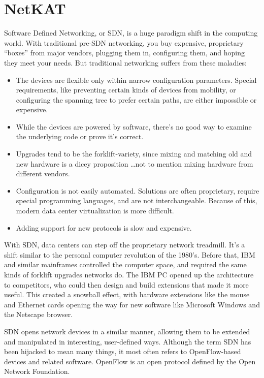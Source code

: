 
\chapter{NetKAT}

Software Defined Networking, or SDN, is a huge paradigm shift in the computing world.  
With traditional pre-SDN networking, you buy 
expensive, proprietary ``boxes'' from major vendors, plugging them in, configuring them, and hoping they 
meet your needs.  
But traditional networking suffers from these maladies:

\begin{itemize}
\item The devices are flexible only within narrow configuration parameters. 
Special requirements, like preventing certain kinds of devices from mobility, or configuring 
the spanning tree to prefer certain paths, are either impossible or expensive.
\item While the devices are powered by software, there's no good way to examine the underlying code or prove it's correct.  
\item Upgrades tend to be the forklift-variety, since mixing and matching old and new hardware is a dicey proposition
\ldots not to mention mixing hardware from different vendors.
\item Configuration is not easily automated. 
Solutions are often proprietary, require special programming languages, and are not interchangeable.
Because of this, modern data center virtualization is more difficult.
\item Adding support for new protocols is slow and expensive.
\end{itemize}

With SDN, data centers can step off the proprietary network treadmill.  
It's a shift similar to the personal computer revolution of the 1980's.
Before that, IBM and similar mainframes controlled the computer space, and required the same kinds of 
forklift upgrades networks do.
The IBM PC opened up the architecture to competitors, who could then design and 
build extensions
that made it more useful.
This created a snowball effect, with hardware extensions like the mouse and Ethernet cards opening the way 
for new software like Microsoft Windows and the Netscape browser.

SDN opens network devices in a similar manner, allowing them to be extended and manipulated in interesting,
user-defined ways.
Although the term SDN has been hijacked to mean many things, it most often refers to OpenFlow-based
devices and related software.
OpenFlow is an open protocol defined by the Open Network Foundation.

